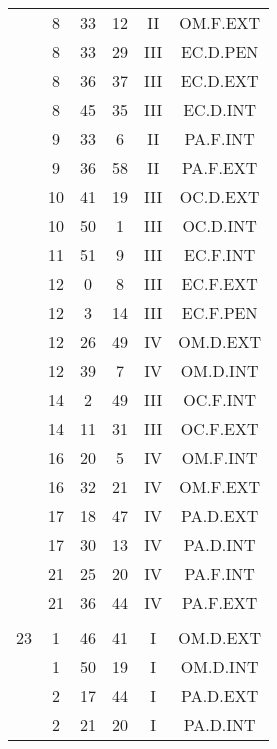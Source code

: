 \documentclass[12pt, a4paper]{article}
\begin{document}
\begin{multicols}{3}
{\begin{tabular}{c c c c c c}
	 	 	 	 & 8 & 33 & 12 & II & OM.F.EXT\\%
	 	 	 	 & 8 & 33 & 29 & III & EC.D.PEN\\%
	 	 	 	 & 8 & 36 & 37 & III & EC.D.EXT\\%
	 	 	 	 & 8 & 45 & 35 & III & EC.D.INT\\%
	 	 	 	 & 9 & 33 & 6 & II & PA.F.INT\\%
	 	 	 	 & 9 & 36 & 58 & II & PA.F.EXT\\%
	 	 	 	 & 10 & 41 & 19 & III & OC.D.EXT\\%
	 	 	 	 & 10 & 50 & 1 & III & OC.D.INT\\%
	 	 	 	 & 11 & 51 & 9 & III & EC.F.INT\\%
	 	 	 	 & 12 & 0 & 8 & III & EC.F.EXT\\%
	 	 	 	 & 12 & 3 & 14 & III & EC.F.PEN\\%
	 	 	 	 & 12 & 26 & 49 & IV & OM.D.EXT\\%
	 	 	 	 & 12 & 39 & 7 & IV & OM.D.INT\\%
	 	 	 	 & 14 & 2 & 49 & III & OC.F.INT\\%
	 	 	 	 & 14 & 11 & 31 & III & OC.F.EXT\\%
	 	 	 	 & 16 & 20 & 5 & IV & OM.F.INT\\%
	 	 	 	 & 16 & 32 & 21 & IV & OM.F.EXT\\%
	 	 	 	 & 17 & 18 & 47 & IV & PA.D.EXT\\%
	 	 	 	 & 17 & 30 & 13 & IV & PA.D.INT\\%
	 	 	 	 & 21 & 25 & 20 & IV & PA.F.INT\\%
	 	 	 	 & 21 & 36 & 44 & IV & PA.F.EXT\\%
	 	 	 	 & & & & & \\%
	 	 	 	23 & 1 & 46 & 41 & I & OM.D.EXT\\%
	 	 	 	 & 1 & 50 & 19 & I & OM.D.INT\\%
	 	 	 	 & 2 & 17 & 44 & I & PA.D.EXT\\%
	 	 	 	 & 2 & 21 & 20 & I & PA.D.INT\\%
	 	 \end{tabular}
 	}
\end{multicols}
\end{document}
